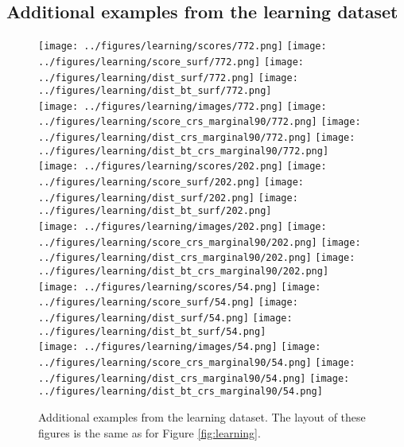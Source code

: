 \newpage
\subsection{Additional examples from the learning dataset}

\begin{figure}[h!]
	\begin{center}
		\texttt{[image: ../figures/learning/scores/772.png]}
		\texttt{[image: ../figures/learning/score\_surf/772.png]}	\texttt{[image: ../figures/learning/dist\_surf/772.png]}
		\texttt{[image: ../figures/learning/dist\_bt\_surf/772.png]}\\
		\texttt{[image: ../figures/learning/images/772.png]}
		\texttt{[image: ../figures/learning/score\_crs\_marginal90/772.png]}
		\texttt{[image: ../figures/learning/dist\_crs\_marginal90/772.png]}
		\texttt{[image: ../figures/learning/dist\_bt\_crs\_marginal90/772.png]}\\
		\vspace{0.5cm}
		\texttt{[image: ../figures/learning/scores/202.png]}
		\texttt{[image: ../figures/learning/score\_surf/202.png]}	\texttt{[image: ../figures/learning/dist\_surf/202.png]}
		\texttt{[image: ../figures/learning/dist\_bt\_surf/202.png]}\\
		\texttt{[image: ../figures/learning/images/202.png]}
		\texttt{[image: ../figures/learning/score\_crs\_marginal90/202.png]}
		\texttt{[image: ../figures/learning/dist\_crs\_marginal90/202.png]}
		\texttt{[image: ../figures/learning/dist\_bt\_crs\_marginal90/202.png]}\\
			\vspace{0.5cm}
		\texttt{[image: ../figures/learning/scores/54.png]}
		\texttt{[image: ../figures/learning/score\_surf/54.png]}	\texttt{[image: ../figures/learning/dist\_surf/54.png]}
		\texttt{[image: ../figures/learning/dist\_bt\_surf/54.png]}\\
		\texttt{[image: ../figures/learning/images/54.png]}
		\texttt{[image: ../figures/learning/score\_crs\_marginal90/54.png]}
		\texttt{[image: ../figures/learning/dist\_crs\_marginal90/54.png]}
		\texttt{[image: ../figures/learning/dist\_bt\_crs\_marginal90/54.png]}
	\end{center}
	\caption{Additional examples from the learning dataset. The layout of these figures is the same as for Figure \ref{fig:learning}.}
	\label{fig:learning2}
\end{figure}

